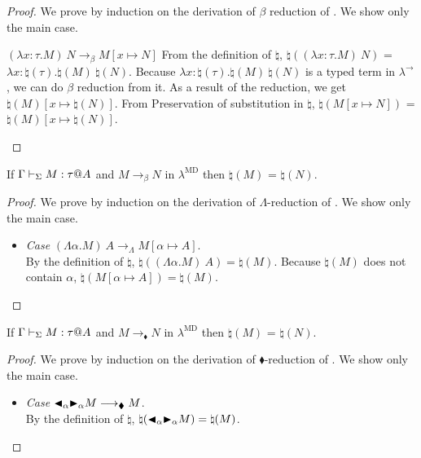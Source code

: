 \begin{proof}
    {
        We prove by induction on the derivation of $\beta$ reduction of \LMD.
        We show only the main case.
        \newcommand{\R}{\longrightarrow_{\beta}}
        \begin{rneqncase}{$(\lambda x:\tau.M)\ N \R M[x \mapsto N]$}{}
            From the definition of $\natural$,
            $\natural((\lambda x:\tau.M)\ N)$ = $\lambda x:\natural(\tau).\natural(M)\ \natural(N)$.
            Because $\lambda x:\natural(\tau).\natural(M)\ \natural(N)$ is a typed term in $\lambda^\to$,
            we can do $\beta$ reduction from it.
            As a result of the reduction, we get $\natural(M)[x\mapsto\natural(N)]$.
            From Preservation of substitution in $\natural$, $\natural(M[x \mapsto N])$ = $\natural(M)[x\mapsto\natural(N)]$.
        \end{rneqncase}

    }
\end{proof}

\begin{lemma}
    If $\G \V M:\tau@A$ and $M \longrightarrow_\beta N$ in $\lambda^{\text{MD}}$
    then $\natural(M)$ =  $\natural(N)$.
\end{lemma}

\begin{proof}
    We prove by induction on the derivation of $\Lambda$-reduction of \LMD.
    We show only the main case.
    \begin{itemize}
        \item \textit{Case} \( (\Lambda\alpha.M)\ A \longrightarrow_\Lambda M[\alpha\mapsto A] \).\\
            By the definition of $\natural$, \(\natural((\Lambda\alpha.M)\ A) = \natural(M)\).
            Because \(\natural(M)\) does not contain \(\alpha\), \(\natural(M[\alpha\mapsto A]) = \natural(M)\).
    \end{itemize}

\end{proof}

\begin{lemma}
    If $\G \V M:\tau@A$ and $M \longrightarrow_\blacklozenge N$ in $\lambda^{\text{MD}}$
    then $\natural(M)$ =  $\natural(N)$.
\end{lemma}

\begin{proof}
    We prove by induction on the derivation of $\blacklozenge$-reduction of \LMD.
    We show only the main case.
    \begin{itemize}
        \item \textit{Case} \( {\mathop{\blacktriangleleft}}_\alpha {\mathop{\blacktriangleright}}_\alpha M \longrightarrow_\blacklozenge M \).\\
            By the definition of $\natural$, \(\natural({\mathop{\blacktriangleleft}}_\alpha {\mathop{\blacktriangleright}}_\alpha M) = \natural(M)\).
    \end{itemize}

\end{proof}

